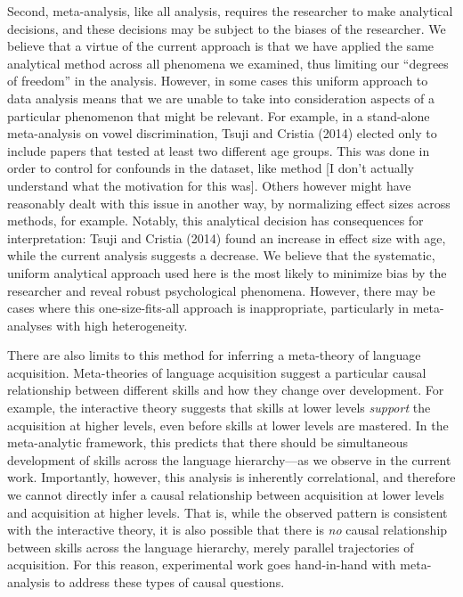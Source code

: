 \documentclass[english,floatsintext,man]{apa6}
\begin{document}
Second, meta-analysis, like all analysis, requires the researcher to
make analytical decisions, and these decisions may be subject to the
biases of the researcher. We believe that a virtue of the current
approach is that we have applied the same analytical method across all
phenomena we examined, thus limiting our \enquote{degrees of freedom} in
the analysis. However, in some cases this uniform approach to data
analysis means that we are unable to take into consideration aspects of
a particular phenomenon that might be relevant. For example, in a
stand-alone meta-analysis on vowel discrimination, Tsuji and Cristia
(2014) elected only to include papers that tested at least two different
age groups. This was done in order to control for confounds in the
dataset, like method {[}I don't actually understand what the motivation
for this was{]}. Others however might have reasonably dealt with this
issue in another way, by normalizing effect sizes across methods, for
example. Notably, this analytical decision has consequences for
interpretation: Tsuji and Cristia (2014) found an increase in effect
size with age, while the current analysis suggests a decrease. We
believe that the systematic, uniform analytical approach used here is
the most likely to minimize bias by the researcher and reveal robust
psychological phenomena. However, there may be cases where this
one-size-fits-all approach is inappropriate, particularly in
meta-analyses with high heterogeneity.

There are also limits to this method for inferring a meta-theory of
language acquisition. Meta-theories of language acquisition suggest a
particular causal relationship between different skills and how they
change over development. For example, the interactive theory suggests
that skills at lower levels \emph{support} the acquisition at higher
levels, even before skills at lower levels are mastered. In the
meta-analytic framework, this predicts that there should be simultaneous
development of skills across the language hierarchy---as we observe in
the current work. Importantly, however, this analysis is inherently
correlational, and therefore we cannot directly infer a causal
relationship between acquisition at lower levels and acquisition at
higher levels. That is, while the observed pattern is consistent with
the interactive theory, it is also possible that there is \emph{no}
causal relationship between skills across the language hierarchy, merely
parallel trajectories of acquisition. For this reason, experimental work
goes hand-in-hand with meta-analysis to address these types of causal
questions.
\end{document}
